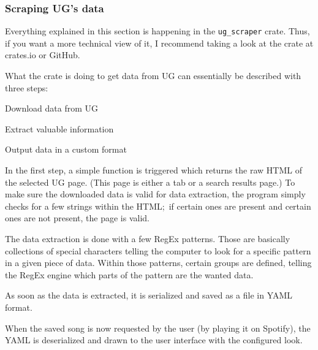 \documentclass[12pt, a4paper]{article}
\begin{document}
                        \subsubsection{Scraping UG's data}
                                Everything explained in this section is happening in the \texttt{ug\_scraper} crate. Thus, if you want a more technical view of it, I recommend taking a look at the crate at crates.io or GitHub.

                                What the crate is doing to get data from UG can essentially be described with three steps:
                                \vspace{\baselineskip}
                                \begin{compactenum}
                                        \item Download data from UG\\
                                        \item Extract valuable information\\
                                        \item Output data in a custom format
                                \end{compactenum}
                                \vspace{\baselineskip}

                                In the first step, a simple function is triggered which returns the raw HTML of the selected UG page. (This page is either a tab or a search results page.) To make sure the downloaded data is valid for data extraction, the program simply checks for a few strings within the HTML;\ if certain ones are present and certain ones are not present, the page is valid.

                                The data extraction is done with a few RegEx patterns. Those are basically collections of special characters telling the computer to look for a specific pattern in a given piece of data. Within those patterns, certain groups are defined, telling the RegEx engine which parts of the pattern are the wanted data.
                                
                                As soon as the data is extracted, it is serialized and saved as a file in YAML format. 

                                When the saved song is now requested by the user (by playing it on Spotify), the YAML is deserialized and drawn to the user interface with the configured look.
\end{document}
